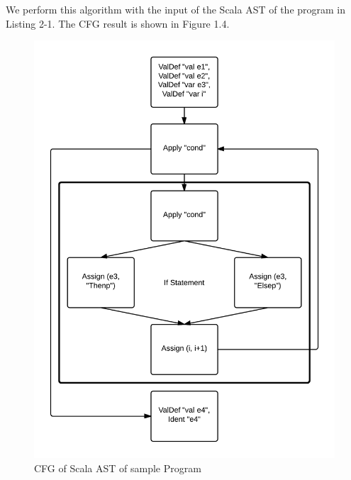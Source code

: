 We perform this algorithm with the input of the Scala AST of the program in Listing 2-1. The CFG result is shown in Figure 1.4. 

\begin{figure}[h!]
\centering
\includegraphics[width=0.7\linewidth]{figures/FinalGraph}
\caption{CFG of Scala AST of sample Program}
\label{fig:FinalGraph}
\end{figure}



